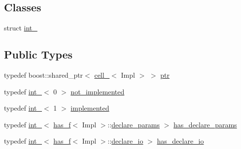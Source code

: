\subsection*{Classes}
\begin{DoxyCompactItemize}
\item 
struct \hyperlink{structecto_1_1cell___1_1int__}{int\+\_\+}
\end{DoxyCompactItemize}
\subsection*{Public Types}
\begin{DoxyCompactItemize}
\item 
typedef boost\+::shared\+\_\+ptr$<$ \hyperlink{structecto_1_1cell__}{cell\+\_\+}$<$ Impl $>$ $>$ \hyperlink{structecto_1_1cell___a26d9e255a2ba0335c5e90fd04efa6bfa}{ptr}
\item 
typedef \hyperlink{structecto_1_1cell___1_1int__}{int\+\_\+}$<$ 0 $>$ \hyperlink{structecto_1_1cell___a3e48e52421d132bb2bb4e343f771abeb}{not\+\_\+implemented}
\item 
typedef \hyperlink{structecto_1_1cell___1_1int__}{int\+\_\+}$<$ 1 $>$ \hyperlink{structecto_1_1cell___a63c5c3dd95630a508017730ee345c23a}{implemented}
\item 
typedef \hyperlink{structecto_1_1cell___1_1int__}{int\+\_\+}$<$ \hyperlink{structecto_1_1has__f}{has\+\_\+f}$<$ Impl $>$\+::\hyperlink{structecto_1_1cell___a6a36edc8e9eddadfe6486460bab93c93}{declare\+\_\+params} $>$ \hyperlink{structecto_1_1cell___ab7b111eb2672ae4eaacc668852b8b89f}{has\+\_\+declare\+\_\+params}
\item 
typedef \hyperlink{structecto_1_1cell___1_1int__}{int\+\_\+}$<$ \hyperlink{structecto_1_1has__f}{has\+\_\+f}$<$ Impl $>$\+::\hyperlink{structecto_1_1cell___ac08370823fea8ed7f5991e369f6a7fa7}{declare\+\_\+io} $>$ \hyperlink{structecto_1_1cell___a10ab0d3f85e194d548beb3251416a569}{has\+\_\+declare\+\_\+io}
\end{DoxyCompactItemize}
